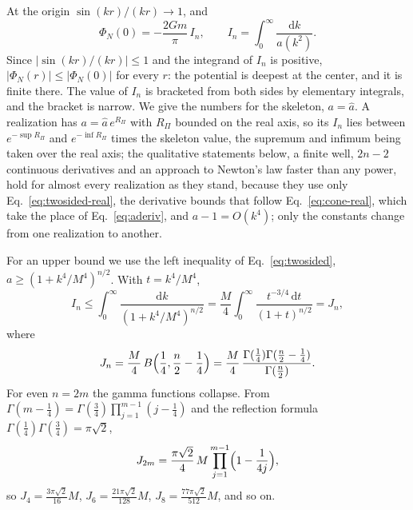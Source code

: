 \documentclass[aps,prd,10pt,twocolumn,superscriptaddress,nofootinbib,floatfix,longbibliography]{revtex4-2}
\newcommand{\dd}{\mathrm{d}}
\begin{document}
At the origin $\sin(kr)/(kr)\to1$, and
\begin{equation}
\label{eq:pot0}
\Phi_N(0)=-\frac{2Gm}{\pi}\,I_n,\qquad I_n=\int_0^\infty\frac{\dd k}{a(k^2)} .
\end{equation}
Since $|\sin(kr)/(kr)|\le1$ and the integrand of $I_n$ is positive, $|\Phi_N(r)|\le|\Phi_N(0)|$ for every $r$: the potential is deepest at the center, and it is finite there. The value of $I_n$ is bracketed from both sides by elementary integrals, and the bracket is narrow. We give the numbers for the skeleton, $a=\hat a$. A realization has $a=\hat a\,e^{R_\Pi}$ with $R_\Pi$ bounded on the real axis, so its $I_n$ lies between $e^{-\sup R_\Pi}$ and $e^{-\inf R_\Pi}$ times the skeleton value, the supremum and infimum being taken over the real axis; the qualitative statements below, a finite well, $2n-2$ continuous derivatives and an approach to Newton's law faster than any power, hold for almost every realization as they stand, because they use only Eq.~\eqref{eq:twosided-real}, the derivative bounds that follow Eq.~\eqref{eq:cone-real}, which take the place of Eq.~\eqref{eq:aderiv}, and $a-1=O(k^4)$; only the constants change from one realization to another.

For an upper bound we use the left inequality of Eq.~\eqref{eq:twosided}, $a\ge(1+k^4/M^4)^{n/2}$. With $t=k^4/M^4$,
\begin{equation}
\label{eq:Jn}
I_n\le\int_0^\infty\frac{\dd k}{(1+k^4/M^4)^{n/2}}=\frac M4\int_0^\infty\frac{t^{-3/4}\,\dd t}{(1+t)^{n/2}}=J_n,
\end{equation}
where
\begin{equation}
\label{eq:Jn-closed}
J_n=\frac M4\,B\Bigl(\frac14,\frac n2-\frac14\Bigr)=\frac M4\,\frac{\Gamma(\frac14)\Gamma(\frac n2-\frac14)}{\Gamma(\frac n2)} .
\end{equation}
For even $n=2m$ the gamma functions collapse. From $\Gamma(m-\frac14)=\Gamma(\frac34)\prod_{j=1}^{m-1}(j-\frac14)$ and the reflection formula $\Gamma(\frac14)\Gamma(\frac34)=\pi\sqrt2$,
\begin{equation}
\label{eq:Jeven}
J_{2m}=\frac{\pi\sqrt2}{4}\,M\prod_{j=1}^{m-1}\Bigl(1-\frac1{4j}\Bigr),
\end{equation}
so $J_4=\frac{3\pi\sqrt2}{16}M$, $J_6=\frac{21\pi\sqrt2}{128}M$, $J_8=\frac{77\pi\sqrt2}{512}M$, and so on.
\end{document}

